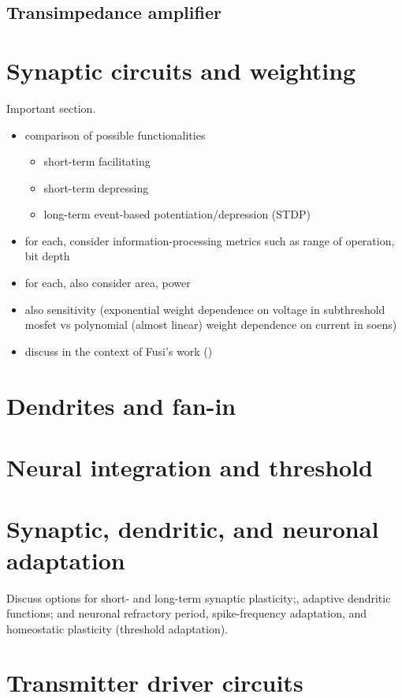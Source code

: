 \documentclass[twocolumn]{article}
\begin{document}
\subsection{Transimpedance amplifier}

\section{\label{sec:synapses}Synaptic circuits and weighting}
Important section.
\begin{itemize}
\item comparison of possible functionalities
\begin{itemize}
\item short-term facilitating
\item short-term depressing
\item long-term event-based potentiation/depression (STDP)
\end{itemize}
\item for each, consider information-processing metrics such as range of operation, bit depth 
\item for each, also consider area, power
\item also sensitivity (exponential weight dependence on voltage in subthreshold mosfet vs polynomial (almost linear) weight dependence on current in soens)
\item discuss in the context of Fusi's work (\cite{amfu1994,fudr2005,fuab2007})
\end{itemize}

\section{\label{sec:dendrites}Dendrites and fan-in}

\section{\label{sec:neurons}Neural integration and threshold}

\section{\label{sec:adaptation}Synaptic, dendritic, and neuronal adaptation}
Discuss options for short- and long-term synaptic plasticity;, adaptive dendritic functions; and neuronal refractory period, spike-frequency adaptation, and homeostatic plasticity (threshold adaptation).

\section{\label{sec:transmitters}Transmitter driver circuits}
\end{document}
